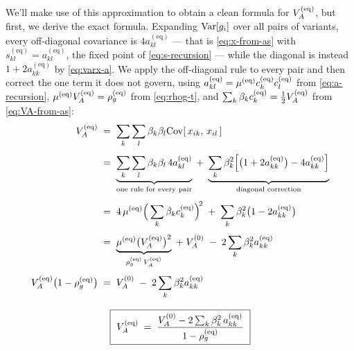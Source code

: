 \documentclass[12pt]{article}
\begin{document}
We'll make use of this approximation to obtain a clean formula for $V_A^{(\mathrm{eq})}$, but first, we derive the exact formula.
Expanding $\mathrm{Var}[g_i]$ over all pairs of variants, every off-diagonal covariance is $4a^{(\mathrm{eq})}_{kl}$ --- that is \eqref{eq:x-from-as} with $s^{(\mathrm{eq})}_{kl} = a^{(\mathrm{eq})}_{kl}$, the fixed point of \eqref{eq:s-recursion} --- while the diagonal is instead $1 + 2a^{(\mathrm{eq})}_{kk}$ by \eqref{eq:varx-a}.
We apply the off-diagonal rule to every pair and then correct the one term it does not govern, using
$a^{(\mathrm{eq})}_{kl} = \mu^{(\mathrm{eq})} c^{(\mathrm{eq})}_k c^{(\mathrm{eq})}_l$ from \eqref{eq:a-recursion},
$\mu^{(\mathrm{eq})}V_A^{(\mathrm{eq})} = \rho_g^{(\mathrm{eq})}$ from \eqref{eq:rhog-t},
and $\sum_k \beta_k c^{(\mathrm{eq})}_k = \tfrac12V_A^{(\mathrm{eq})}$ from \eqref{eq:VA-from-as}:
\begin{equation}\label{eq:VA-eq-exact}
\begin{gathered}
\begin{aligned}
    V_A^{(\mathrm{eq})} \;&=\; \sum_k\sum_l \beta_k\beta_l \mathrm{Cov}[\,x_{ik},\, x_{il}\,] \\[4pt]
    \;&=\; \underbrace{\sum_k\sum_l \beta_k\beta_l\,4a^{(\mathrm{eq})}_{kl}}_{\text{one rule for every pair}}
    \;+\; \underbrace{\sum_k \beta_k^2\Big[\big(1 + 2a^{(\mathrm{eq})}_{kk}\big) - 4a^{(\mathrm{eq})}_{kk}\Big]}_{\text{diagonal correction}} \\[4pt]
    \;&=\; 4\,\mu^{(\mathrm{eq})}\Big(\sum_k \beta_k c^{(\mathrm{eq})}_k\Big)^{\!2}
    \;+\; \sum_k \beta_k^2\big(1 - 2a^{(\mathrm{eq})}_{kk}\big) \\[4pt]
    \;&=\; \underbrace{\mu^{(\mathrm{eq})}\big(V_A^{(\mathrm{eq})}\big)^2}_{\rho_g^{(\mathrm{eq})}\,V_A^{(\mathrm{eq})}}
    \;+\; V_A^{(0)} \;-\; 2\sum_k \beta_k^2 a^{(\mathrm{eq})}_{kk} \\[4pt]
    V_A^{(\mathrm{eq})}\big(1-\rho_g^{(\mathrm{eq})}\big) \;&=\; V_A^{(0)} \;-\; 2\sum_k \beta_k^2 a^{(\mathrm{eq})}_{kk}
\end{aligned} \\[8pt]
    \boxed{\ V_A^{(\mathrm{eq})} \;=\; \frac{V_A^{(0)} - 2\sum_k \beta_k^2\, a^{(\mathrm{eq})}_{kk}}{1-\rho_g^{(\mathrm{eq})}}\ }
\end{gathered}
\end{equation}
\end{document}
